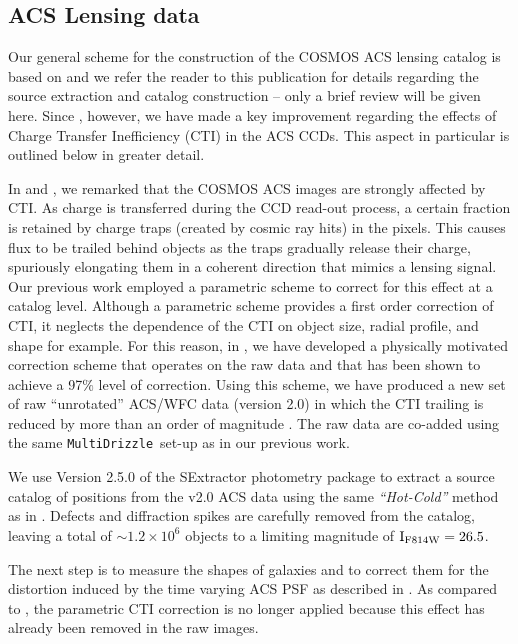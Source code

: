 \documentclass[12pt]{emulateapj}
\def\multidrizzle{{\tt MultiDrizzle}}
\begin{document}
\subsection{ACS Lensing data}

Our general scheme for the construction of the COSMOS ACS lensing
catalog is based on \citet{Leauthaud:2007} and we refer the reader to
this publication for details regarding the source extraction and
catalog construction -- only a brief review will be given here. Since
\citet{Leauthaud:2007}, however, we have made a key improvement
regarding the effects of Charge Transfer Inefficiency (CTI) in the ACS
CCDs. This aspect in particular is outlined below in greater detail.

In \citet{Leauthaud:2007} and \citet{Rhodes:2007}, we remarked that
the COSMOS ACS images are strongly affected by CTI. As charge is
transferred during the CCD read-out process, a certain fraction is
retained by charge traps (created by cosmic ray hits) in the
pixels. This causes flux to be trailed behind objects as the traps
gradually release their charge, spuriously elongating them in a
coherent direction that mimics a lensing signal. Our previous work
employed a parametric scheme to correct for this effect at a catalog
level. Although a parametric scheme provides a first order correction
of CTI, it neglects the dependence of the CTI on object size, radial
profile, and shape for example. For this reason, in
\citet[][]{Massey:2009}, we have developed a physically motivated
correction scheme that operates on the raw data and that has been
shown to achieve a 97$\%$ level of correction. Using this scheme, we
have produced a new set of raw ``unrotated'' ACS/WFC data (version
2.0) in which the CTI trailing is reduced by more than an order of
magnitude \citep[for further details, see][]{Massey:2009}. The raw
data are co-added using the same \multidrizzle\ set-up as in our
previous work.

We use Version 2.5.0 of the SExtractor photometry package
\citep{Bertin:1996} to extract a source catalog of positions from the
v2.0 ACS data using the same \textit{``Hot-Cold''} method as in
\citet{Leauthaud:2007}. Defects and diffraction spikes are carefully
removed from the catalog, leaving a total of $ \sim 1.2 \times 10^6$
objects to a limiting magnitude of $\rm{I}_{F814W}=26.5$.

The next step is to measure the shapes of galaxies and to correct them
for the distortion induced by the time varying ACS PSF as described in
\citet[][]{Rhodes:2007}. As compared to \citet[][]{Rhodes:2007}, the
parametric CTI correction is no longer applied because this effect has
already been removed in the raw images.
\end{document}
